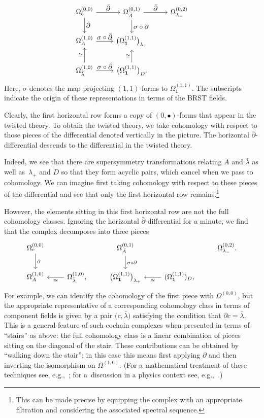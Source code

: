 \documentclass[10pt,a4paper]{amsart}
\numberwithin{equation}{section}
\theoremstyle{definition}
\begin{document}
\[
 \begin{tikzcd}
 \Omega^{(0,0)}_c \arrow[d, "\textstyle\partial"] \arrow[r, "\textstyle \bar{\partial}"] & \Omega^{(0,1)}_{\bar{A}} \arrow[r, "\textstyle\bar{\partial}"] \arrow[d, "\textstyle\sigma \circ \partial"] & \Omega^{(0,2)}_{\lambda_-} \\
 \Omega^{(1,0)}_A \arrow[r, "\textstyle\sigma \circ \bar{\partial}"] & \big(\Omega^{(1,1)}_\textbf{1}\big)_{\lambda_+} \\
 \Omega^{(1,0)}_{\bar{\lambda}} \arrow[u, "\cong"] \arrow[r, "\textstyle \sigma \circ \bar{\partial}"] & \big(\Omega^{(1,1)}_\textbf{1}\big)_{D} \arrow[u, "\cong"].
 \end{tikzcd}
\]
Here, $\sigma$ denotes the map projecting $(1,1)$-forms to $\Omega^{(1,1)}_\textbf{1}$. The subscripts indicate the origin of these representations in terms of the BRST fields.

Clearly, the first horizontal row forms a copy of $(0,\bullet)$-forms that appear in the twisted theory. To obtain the twisted theory, we take cohomology with respect to those pieces of the differential denoted vertically in the picture. The horizontal $\bar{\partial}$-differential descends to the differential in the twisted theory.

Indeed, we see that there are supersymmetry transformations relating $A$ and $\bar{\lambda}$ as well as~$\lambda_+$ and $D$ so that they form acyclic pairs, which cancel when we pass to cohomology. We can imagine first taking cohomology with respect to these pieces of the differential and see that only the first horizontal row remains.\footnote{This can be made precise by equipping the complex with an appropriate filtration and considering the associated spectral sequence.}

However, the elements sitting in this first horizontal row are not the full cohomology classes. Ignoring the horizontal $\bar{\partial}$-differential for a minute, we find that the complex decomposes into three pieces
\[
 \begin{tikzcd}
 \Omega^{(0,0)}_c \arrow[d, "\partial"] & & \Omega^{(0,1)}_{\bar{A}} \arrow[d, "\sigma \circ \partial"] & & \Omega^{(0,2)}_{\lambda_-}. \\
 \Omega^{(1,0)}_A & \Omega^{(1,0)}_{\bar{\lambda}} \arrow[l, "\cong"], & \big(\Omega^{(1,1)}_\textbf{1}\big)_{\lambda_+} & (\Omega^{(1,1)}_\textbf{1})_{D} \arrow[l,"\cong"],
 \end{tikzcd}
\]
For example, we can identify the cohomology of the first piece with $\Omega^{(0,0)}$, but the appropriate representative of a corresponding cohomology class in terms of component fields is given by a pair $\big(c, \bar{\lambda}\big)$ satisfying the condition that $\partial c = \bar{\lambda}$. This is a general feature of such cochain complexes when presented in terms of ``stairs'' as above: the full cohomology class is a linear combination of pieces sitting on the diagonal of the stair. These contributions can be obtained by ``walking down the stair''; in this case this means first applying $\partial$ and then inverting the isomorphism on $\Omega^{(1,0)}$. (For a mathematical treatment of these techniques see, e.g.,~\cite{Stelzig}; for a~discussion in a physics context see, e.g.,~\cite{BPS-SS}.)
\end{document}
